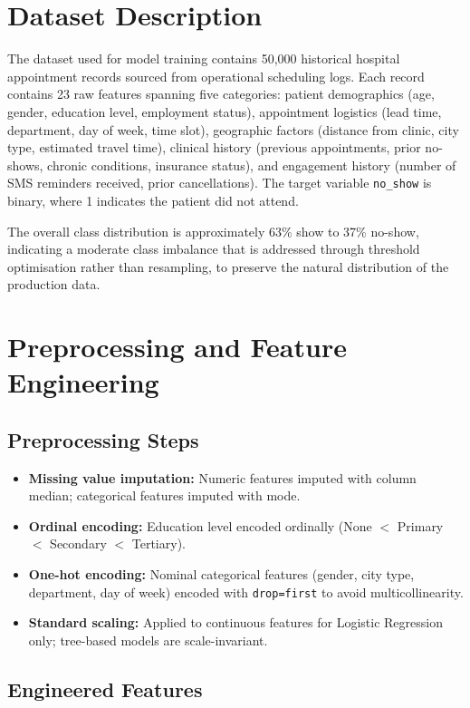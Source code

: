 \documentclass[12pt, a4paper]{report}
\begin{document}
\section{Dataset Description}

The dataset used for model training contains 50,000 historical hospital appointment records sourced from operational scheduling logs. Each record contains 23 raw features spanning five categories: patient demographics (age, gender, education level, employment status), appointment logistics (lead time, department, day of week, time slot), geographic factors (distance from clinic, city type, estimated travel time), clinical history (previous appointments, prior no-shows, chronic conditions, insurance status), and engagement history (number of SMS reminders received, prior cancellations). The target variable \texttt{no\_show} is binary, where 1 indicates the patient did not attend.

The overall class distribution is approximately 63\% show to 37\% no-show, indicating a moderate class imbalance that is addressed through threshold optimisation rather than resampling, to preserve the natural distribution of the production data.

\section{Preprocessing and Feature Engineering}

\subsection{Preprocessing Steps}

\begin{itemize}
  \item \textbf{Missing value imputation:} Numeric features imputed with column median; categorical features imputed with mode.
  \item \textbf{Ordinal encoding:} Education level encoded ordinally (None $<$ Primary $<$ Secondary $<$ Tertiary).
  \item \textbf{One-hot encoding:} Nominal categorical features (gender, city type, department, day of week) encoded with \texttt{drop=first} to avoid multicollinearity.
  \item \textbf{Standard scaling:} Applied to continuous features for Logistic Regression only; tree-based models are scale-invariant.
\end{itemize}

\subsection{Engineered Features}
\end{document}
